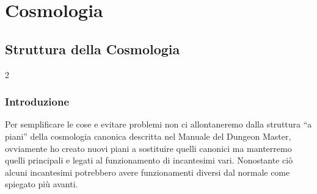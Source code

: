 \documentclass[10pt, a4paper]{report}
\newcommand{\partimagefile}{}
\newcommand{\partimage}[1]{%
	\renewcommand{\partimagefile}{#1}%
}
\begin{document}
\partimage{cosmpart1.png}
\part{Cosmologia}

\chapter{Struttura della Cosmologia}
\begin{multicols}{2}
\section{Introduzione}
 Per semplificare le cose e evitare problemi non ci allontaneremo dalla struttura \enquote{a piani} della cosmologia canonica descritta nel Manuale del Dungeon Master, ovviamente ho creato nuovi piani a sostituire quelli canonici ma manterremo quelli principali e legati al funzionamento di incantesimi vari. Nonostante ciò alcuni incantesimi potrebbero avere funzionamenti diversi dal normale come spiegato più avanti.

\end{multicols}
\end{document}
